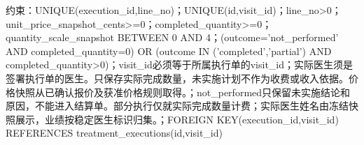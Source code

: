 \documentclass[UTF8,12pt,a4paper,fontset=none]{ctexart}
\begin{document}
约束：UNIQUE(\allowbreak{}execution\_\allowbreak{}id,\allowbreak{}line\_\allowbreak{}no)\allowbreak{}；UNIQUE(\allowbreak{}id,\allowbreak{}visit\_\allowbreak{}id)\allowbreak{}；line\_\allowbreak{}no>\allowbreak{}0；unit\_\allowbreak{}price\_\allowbreak{}snapshot\_\allowbreak{}cents>\allowbreak{}=\allowbreak{}0；completed\_\allowbreak{}quantity>\allowbreak{}=\allowbreak{}0；quantity\_\allowbreak{}scale\_\allowbreak{}snapshot BETWEEN 0 AND 4；(\allowbreak{}outcome=\allowbreak{}'not\_\allowbreak{}performed' AND completed\_\allowbreak{}quantity=\allowbreak{}0)\allowbreak{} OR (\allowbreak{}outcome IN (\allowbreak{}'completed',\allowbreak{}'partial')\allowbreak{} AND completed\_\allowbreak{}quantity>\allowbreak{}0)\allowbreak{}；visit\_\allowbreak{}id必须等于所属执行单的visit\_\allowbreak{}id；实际医生须是签署执行单的医生。只保存实际完成数量，未实施计划不作为收费或收入依据。价格快照从已确认报价及获准价格规则取得。；not\_\allowbreak{}performed只保留未实施结论和原因，不能进入结算单。部分执行仅就实际完成数量计费；实际医生姓名由冻结快照展示，业绩按稳定医生标识归集。；FOREIGN KEY(\allowbreak{}execution\_\allowbreak{}id,\allowbreak{}visit\_\allowbreak{}id)\allowbreak{} REFERENCES treatment\_\allowbreak{}executions(\allowbreak{}id,\allowbreak{}visit\_\allowbreak{}id)\allowbreak{}\par
\Needspace{529pt}
\end{document}
